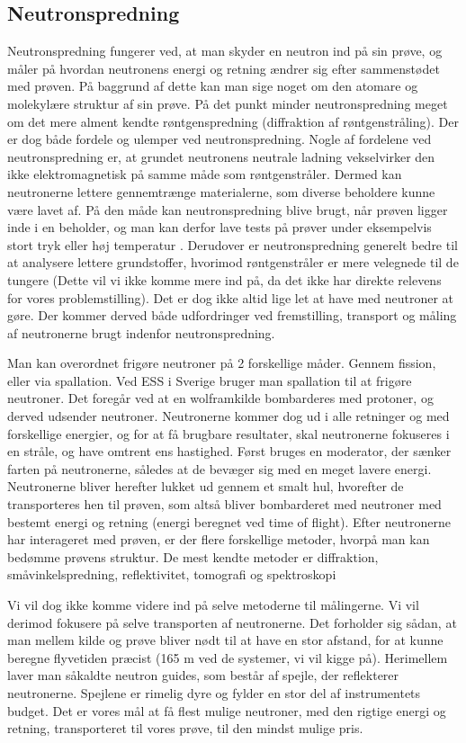 \documentclass[12pt,oneside,a4paper]{article}
\begin{document}
{{{{{\subsection{Neutronspredning}
Neutronspredning fungerer ved, at man skyder en neutron ind på sin prøve, og måler på hvordan neutronens energi og retning ændrer sig efter sammenstødet med prøven. På baggrund af dette kan man sige noget om den atomare og molekylære struktur af sin prøve. På det punkt minder neutronspredning meget om det mere alment kendte røntgenspredning (diffraktion af røntgenstråling). Der er dog både fordele og ulemper ved neutronspredning. Nogle af fordelene ved neutronspredning er, at grundet neutronens neutrale ladning vekselvirker den ikke elektromagnetisk på samme måde som røntgenstråler. Dermed kan neutronerne lettere gennemtrænge materialerne, som diverse beholdere kunne være lavet af. På den måde kan neutronspredning blive brugt, når prøven ligger inde i en beholder, og man kan derfor lave tests på prøver under eksempelvis stort tryk eller høj temperatur . Derudover er neutronspredning generelt bedre til at analysere lettere grundstoffer, hvorimod røntgenstråler er mere velegnede til de tungere (Dette vil vi ikke komme mere ind på, da det ikke har direkte relevens for vores problemstilling). Det er dog ikke altid lige let at have med neutroner at gøre. Der kommer derved både udfordringer ved fremstilling, transport og måling af neutronerne brugt indenfor neutronspredning.


Man kan overordnet frigøre neutroner på 2 forskellige måder. Gennem fission, eller via spallation. Ved ESS i Sverige bruger man spallation til at frigøre neutroner. Det foregår ved at en wolframkilde bombarderes med protoner, og derved udsender neutroner. Neutronerne kommer dog ud i alle retninger og med forskellige energier, og for at få brugbare resultater, skal neutronerne fokuseres i en stråle, og have omtrent ens hastighed. Først bruges en moderator, der sænker farten på neutronerne, således at de bevæger sig med en meget lavere energi. Neutronerne bliver herefter lukket ud gennem et smalt hul, hvorefter de transporteres hen til prøven, som altså bliver bombarderet med neutroner med bestemt energi og retning (energi beregnet ved time of flight). Efter neutronerne har interageret med prøven, er der flere forskellige metoder, hvorpå man kan bedømme prøvens struktur. De mest kendte metoder er diffraktion, småvinkelspredning, reflektivitet, tomografi og spektroskopi \cite{ess_folder}

Vi vil dog ikke komme videre ind på selve metoderne til målingerne. Vi vil derimod fokusere på selve transporten af neutronerne. Det forholder sig sådan, at man mellem kilde og prøve bliver nødt til at have en stor afstand, for at kunne beregne flyvetiden præcist (165 m ved de systemer, vi vil kigge på). Herimellem laver man såkaldte neutron guides, som består af spejle, der reflekterer neutronerne. Spejlene er rimelig dyre og fylder en stor del af instrumentets budget. Det er vores mål at få flest mulige neutroner, med den rigtige energi og retning, transporteret til vores prøve, til den mindst mulige pris.


}}}}}
\end{document}
